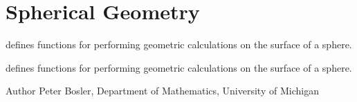 \hypertarget{group__SphereGeom}{\section{Spherical Geometry}
\label{group__SphereGeom}
}


defines functions for performing geometric calculations on the surface of a sphere.  


defines functions for performing geometric calculations on the surface of a sphere. 

\begin{DoxyAuthor}{Author}
Peter Bosler, Department of Mathematics, University of Michigan 
\end{DoxyAuthor}
